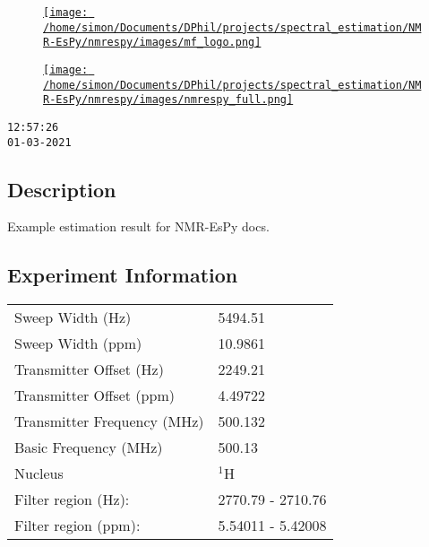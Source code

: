\documentclass[8pt]{article}
\begin{document}
\begin{figure}[!ht]
\begin{minipage}[b][2.5cm][c]{.72\textwidth}
\href{<MFGROUPLINK>}%
{\texttt{[image: /home/simon/Documents/DPhil/projects/spectral\_estimation/NMR-EsPy/nmrespy/images/mf\_logo.png]}}
\end{minipage}
\begin{minipage}[b][2.5cm][c]{.27\textwidth}
\href{https://github.com/foroozandehgroup/NMR-EsPy}%
{\texttt{[image: /home/simon/Documents/DPhil/projects/spectral\_estimation/NMR-EsPy/nmrespy/images/nmrespy\_full.png]}}
\end{minipage}
\end{figure}

\texttt{12:57:26\\01-03-2021}

\subsection*{Description}
Example estimation result for NMR-EsPy docs.

\subsection*{Experiment Information}
\hspace{-6pt}
\begin{tabular}{ll}
Sweep Width (Hz) & 5494.51 \\
Sweep Width (ppm) & 10.9861 \\
Transmitter Offset (Hz) & 2249.21 \\
Transmitter Offset (ppm) & 4.49722 \\
Transmitter Frequency (MHz) & 500.132 \\
Basic Frequency (MHz) & 500.13 \\
Nucleus & $^{1}$H \\
Filter region (Hz): & 2770.79 - 2710.76 \\
Filter region (ppm): & 5.54011 - 5.42008 \\

\end{tabular}
\end{document}
